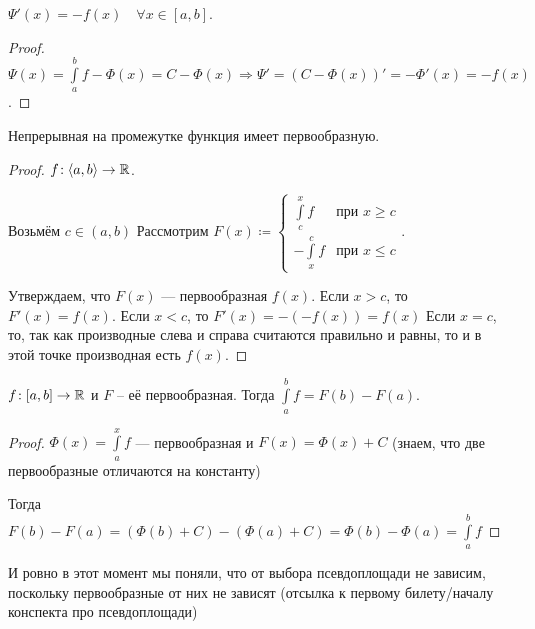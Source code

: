 \begin{consequence}
    $\Psi'(x) = -f(x)\quad \forall x\in [a, b]$.
\end{consequence}
\begin{proof}
    $\Psi(x) = \int\limits_a^b f - \Phi(x) = C - \Phi(x) \Rightarrow \Psi' = (C - \Phi(x))' = -\Phi'(x) = -f(x)$.
\end{proof}
\begin{theorem}
    Непрерывная на промежутке функция имеет первообразную.
\end{theorem}
\begin{proof}
    $f\!: \langle a, b \rangle \to \mathbb{R}$. 

    Возьмём $c \in (a, b)$
    Рассмотрим  $F(x) \coloneqq \begin{cases} \int\limits_c^x f & \text{при } x \ge c \\ -\int\limits_x^c f & \text{при } x \le c \end{cases}$.

    Утверждаем, что $F(x)$ --- первообразная $f(x)$.
    Если $x > c$, то  $F'(x) = f(x)$. 
    Если $x < c$, то $F'(x) = -(-f(x)) = f(x)$
    Если $x = c$, то, так как производные слева и справа считаются правильно и равны, то и в этой точке производная есть $f(x)$.
\end{proof}

\begin{theorem}
    $f\!: [a, b] \to \mathbb{R}$ и  $F$ -- её первообразная. Тогда  $\int\limits_a^b f = F(b) - F(a)$.
\end{theorem}
\begin{proof}
	$\Phi(x) = \int\limits_a^x f$ --- первообразная и  $F(x) = \Phi(x) + C$ (знаем, что две первообразные отличаются на константу)

    Тогда  $F(b) - F(a) = (\Phi(b) + C) - (\Phi(a) + C) = \Phi(b) - \Phi(a) = \int\limits_a^b f$
\end{proof}

И ровно в этот момент мы поняли, что от выбора псевдоплощади не зависим, поскольку первообразные от них не зависят (отсылка к первому билету/началу конспекта про псевдоплощади)

